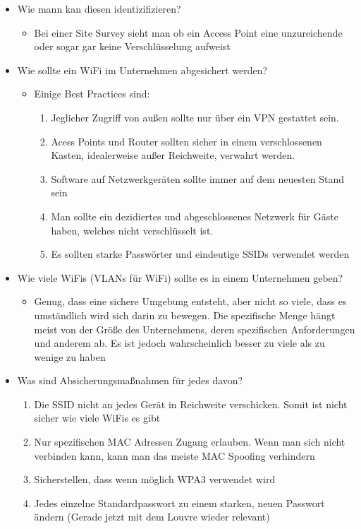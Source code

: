 \documentclass{article}
\begin{document}
\begin{itemize}
\begin{itemize}
		\end{itemize}
		\item{Wie mann kan diesen identizifizieren?}
		\begin{itemize}
			\item{Bei einer Site Survey sieht man ob ein Access Point eine unzureichende oder sogar gar keine Verschlüsselung aufweist}
		\end{itemize}
		\item{Wie sollte ein WiFi im Unternehmen abgesichert werden?}
		\begin{itemize}
			\item{Einige Best Practices sind:}
			\begin{enumerate}
				\item{Jeglicher Zugriff von außen sollte nur über ein VPN gestattet sein.}
				\item{Acess Points und Router sollten sicher in einem verschlossenen Kasten, idealerweise außer Reichweite, verwahrt werden.}
				\item{Software auf Netzwerkgeräten sollte immer auf dem neuesten Stand sein}
				\item{Man sollte ein dezidiertes und abgeschlossenes Netzwerk für Gäste haben, welches nicht verschlüsselt ist.}
				\item{Es sollten starke Passwörter und eindeutige SSIDs verwendet werden}
			\end{enumerate}
		\end{itemize}
		\item{Wie viele WiFis (VLANs für WiFi) sollte es in einem Unternehmen geben?}
		\begin{itemize}
			\item{Genug, dass eine sichere Umgebung entsteht, aber nicht so viele, dass es umständlich wird sich darin zu bewegen. Die spezifische Menge hängt meist von der Größe des Unternehmens, deren spezifischen Anforderungen und anderem ab. Es ist jedoch wahrscheinlich besser zu viele als zu wenige zu haben}
		\end{itemize}
		\item{Was sind Absicherungsmaßnahmen für jedes davon?}
		\begin{enumerate}
			\item{Die SSID nicht an jedes Gerät in Reichweite verschicken. Somit ist nicht sicher wie viele WiFis es gibt}
			\item{Nur spezifischen MAC Adressen Zugang erlauben. Wenn man sich nicht verbinden kann, kann man das meiste MAC Spoofing verhindern}
			\item{Sicherstellen, dass wenn möglich WPA3 verwendet wird}
			\item{Jedes einzelne Standardpasswort zu einem starken, neuen Passwort ändern (Gerade jetzt mit dem Louvre wieder relevant)}
		\end{enumerate}
	\end{itemize}
\end{document}
